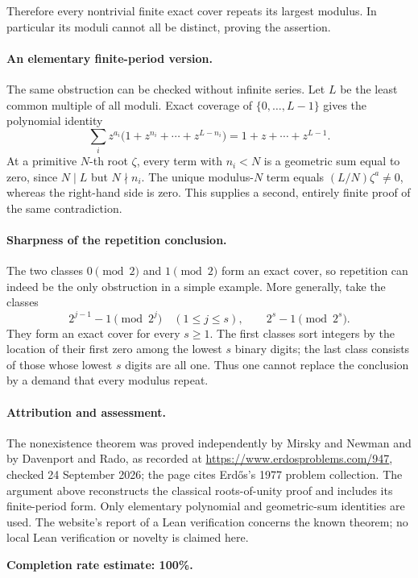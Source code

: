 Therefore every nontrivial finite exact cover repeats its largest modulus. In particular its moduli cannot all be distinct, proving the assertion.

\paragraph{An elementary finite-period version.}
The same obstruction can be checked without infinite series. Let \(L\) be the least common multiple of all moduli. Exact coverage of \(\{0,\ldots,L-1\}\) gives the polynomial identity
\[
 \sum_i z^{a_i}\bigl(1+z^{n_i}+\cdots+z^{L-n_i}\bigr)
 =1+z+\cdots+z^{L-1}.
\]
At a primitive \(N\)-th root \(\zeta\), every term with \(n_i<N\) is a geometric sum equal to zero, since \(N\mid L\) but \(N\nmid n_i\). The unique modulus-\(N\) term equals \((L/N)\zeta^a\ne0\), whereas the right-hand side is zero. This supplies a second, entirely finite proof of the same contradiction.

\paragraph{Sharpness of the repetition conclusion.}
The two classes \(0\pmod2\) and \(1\pmod2\) form an exact cover, so repetition can indeed be the only obstruction in a simple example. More generally, take the classes
\[
 2^{j-1}-1\pmod{2^j}\quad(1\leq j\leq s),
 \qquad 2^s-1\pmod{2^s}.
\]
They form an exact cover for every \(s\geq1\). The first classes sort integers by the location of their first zero among the lowest \(s\) binary digits; the last class consists of those whose lowest \(s\) digits are all one. Thus one cannot replace the conclusion by a demand that every modulus repeat.

\paragraph{Attribution and assessment.}
The nonexistence theorem was proved independently by Mirsky and Newman and by Davenport and Rado, as recorded at \url{https://www.erdosproblems.com/947}, checked 24 September 2026; the page cites Erd\H{o}s's 1977 problem collection. The argument above reconstructs the classical roots-of-unity proof and includes its finite-period form. Only elementary polynomial and geometric-sum identities are used. The website's report of a Lean verification concerns the known theorem; no local Lean verification or novelty is claimed here.

\textbf{Completion rate estimate: 100\%.}
